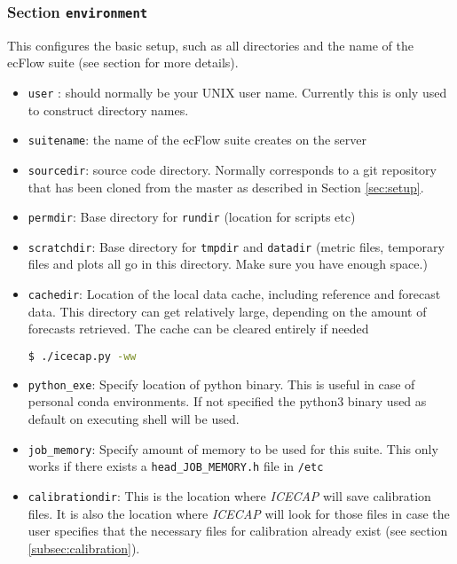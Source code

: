 \documentclass[DIV=10, parskip=full]{scrreprt}
\newcommand{\ice}{\textit{ICECAP}\xspace}
\begin{document}
\subsubsection{Section \texttt{environment}} \label{sec:environment}
This configures the basic setup, such as all directories and the name of the ecFlow suite (see section \label{sec:eflow} for more details).
\begin{itemize}
	\item \texttt{user} : should normally be your UNIX user name. Currently this is only used to construct directory names.
	\item \texttt{suitename}: the name of the ecFlow suite creates on the server 
	\item \texttt{sourcedir}: source code directory. Normally corresponds to a git repository that has been cloned from the master as described in Section \ref{sec:setup}.
	\item \texttt{permdir}: Base directory for \texttt{rundir} (location for scripts etc) 
	\item \texttt{scratchdir}: Base directory for \texttt{tmpdir} and  \texttt{datadir} (metric files, temporary files and plots all go in this directory. Make sure you have enough space.) 
	   \item \texttt{cachedir}: Location of the local data cache, including reference and forecast data. This directory can get relatively large, depending on the amount of forecasts retrieved. The cache can be cleared entirely if needed 
	   \begin{lstlisting}[language=bash]
	   	$ ./icecap.py -ww
	   \end{lstlisting}
	   \item \texttt{python\_exe}: Specify location of python binary. This is useful in case of personal conda environments. If not specified the python3 binary used as default on executing shell will be used.
	  \item \texttt{job\_memory}: Specify amount of memory to be used for this suite. This only works if there exists a \texttt{head\_JOB\_MEMORY.h} file in \texttt{/etc}
	  \item \texttt{calibrationdir}: This is the location where \ice will save calibration files. It is also the location where \ice will look for those files in case the user specifies that the necessary files for calibration already exist (see section \ref{subsec:calibration}).
\end{itemize}
	
\end{document}
